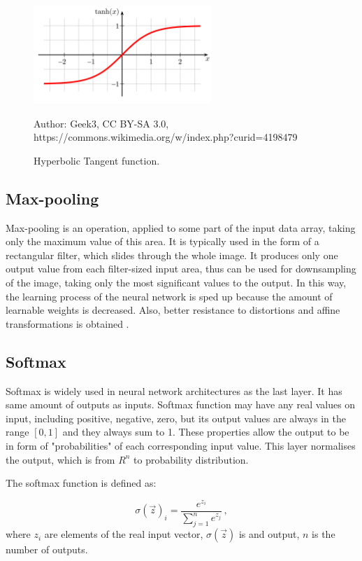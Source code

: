 \begin{figure}[!h]
  \centering
  \includegraphics[width=0.6\textwidth]{./fig/photos/hyperbolic_tangent.png}

  \caption{Hyperbolic Tangent function.}
  Author: Geek3, CC BY-SA 3.0, https://commons.wikimedia.org/w/index.php?curid=4198479
  \label{fig:htangent}
\end{figure}


\subsection{Max-pooling}

Max-pooling is an operation, applied to some part of the input data array, taking only the maximum value of this area. It is typically used in the form of a rectangular filter, which slides through the whole image. It produces only one output value from each filter-sized input area, thus can be used for downsampling of the image, taking only the most significant values to the output. In this way, the learning process of the neural network is sped up because the amount of learnable weights is decreased. Also, better resistance to distortions and affine transformations is obtained \cite{yu2014mixed}.

\subsection{Softmax}

Softmax is widely used in neural network architectures as the last layer. It has same amount of outputs as inputs. Softmax function may have any real values on input, including positive, negative, zero, but its output values are always in the range $[0, 1]$ and they always sum to 1. These properties allow the output to be in form of "probabilities" of each corresponding input value. This layer normalises the output, which is from $R^n$ to probability distribution.

The softmax function is defined as:

\begin{equation}
	\sigma(\vec z)_i = \frac{e^{z_i}}{\sum\limits_{j=1}^n e^{z_j}}\,,
\end{equation}
where $z_i$ are elements of the real input vector, $\sigma(\vec z)$ is and output, $n$ is the number of outputs.



